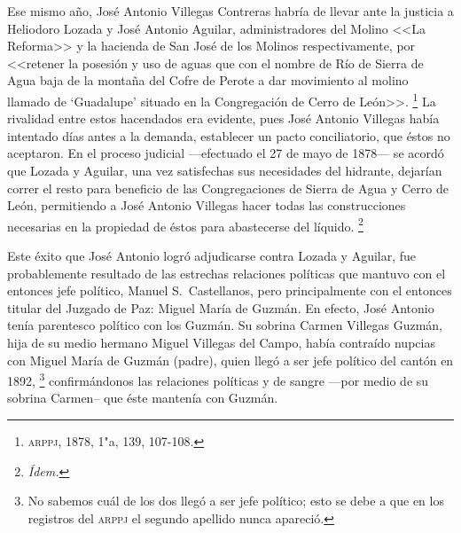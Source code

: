 \documentclass[14pt,twoside,final]{extbook} %
\let\oldfootnote\footnote
\renewcommand\footnote[1]{%
\oldfootnote{\hspace{1mm}#1}}
\begin{document}
Ese mismo año, José Antonio Villegas Contreras habría de llevar ante la justicia a Heliodoro Lozada y José Antonio Aguilar, administradores del Molino <<La Reforma>> y la hacienda de San José de los Molinos respectivamente, por <<retener la posesión y uso de aguas que con el nombre de Río de Sierra de Agua baja de la montaña del Cofre de Perote a dar movimiento al molino llamado de  `Guadalupe' situado en la Congregación de Cerro de León>>.\footnote{\textsc{arppj}, 1878, 1"a, 139, 107-108.} La rivalidad entre estos hacendados era evidente, pues José Antonio Villegas había intentado días antes a la demanda, establecer un pacto conciliatorio, que éstos no aceptaron. En el proceso judicial ---efectuado el 27 de mayo de 1878--- se acordó que Lozada y Aguilar, una vez satisfechas sus necesidades del hidrante, dejarían correr el resto para beneficio de las Congregaciones de Sierra de Agua y Cerro de León, permitiendo a José Antonio Villegas hacer todas las construcciones necesarias en la propiedad de éstos para abastecerse del líquido.\footnote{\em Ídem.}

Este éxito que José Antonio logró adjudicarse contra Lozada y Aguilar, fue probablemente resultado de las estrechas relaciones políticas que mantuvo con el entonces jefe político, Manuel S.~Castellanos, pero principalmente con el entonces titular del Juzgado de Paz: Miguel María de Guzmán. En efecto, José Antonio tenía parentesco político con los Guzmán. Su sobrina Carmen Villegas Guzmán, hija de su
medio hermano Miguel Villegas del Campo, había contraído nupcias con Miguel María de Guzmán (padre), quien llegó a ser jefe político del cantón en 1892,\footnote{No sabemos cuál de los dos llegó a ser jefe político; esto se debe a que en los registros del \textsc{arppj} el segundo apellido nunca apareció.} confirmándonos las relaciones políticas y de sangre ---por medio de su sobrina Carmen-- que éste mantenía con Guzmán.
\end{document}
